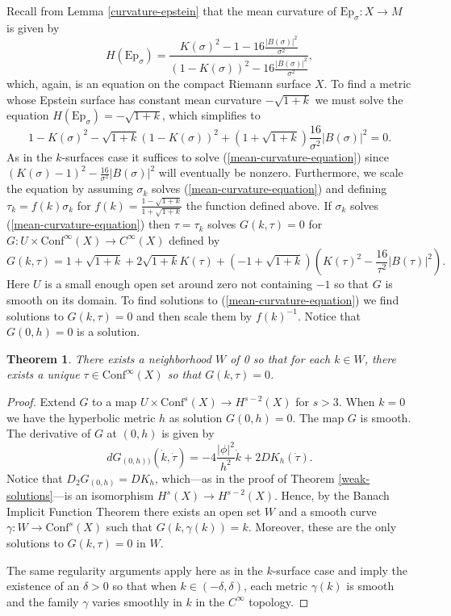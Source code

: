 \documentclass{amsart}
\newtheorem{thm}{Theorem}[section]
\begin{document}
Recall from Lemma \ref{curvature-epstein} that the mean curvature of $\mathrm{Ep}_\sigma: X \to M$ is given by 
\[
H(\mathrm{Ep}_\sigma)
= \frac{K(\sigma)^2 - 1 - 16 \frac{|B(\sigma)|^2}{\sigma^2}}{(1-K(\sigma))^2 - 16 \frac{|B(\sigma)|^2}{\sigma^2}},
\]
which, again, is an equation on the compact Riemann surface $X$.
To find a metric whose Epstein surface has constant mean curvature $-\sqrt{1+k}$ we must solve the equation $H(\mathrm{Ep}_\sigma) = -\sqrt{1+k}$, which simplifies to
\begin{equation}
\label{mean-curvature-equation}
1-K(\sigma)^2 - \sqrt{1+k}(1-K(\sigma))^2 + (1 + \sqrt{1+k})\frac{16}{\sigma^2}|B(\sigma)|^2 = 0.
\end{equation}
As in the $k$-surfaces case it suffices to solve (\ref{mean-curvature-equation}) since $(K(\sigma) - 1)^2 - \frac{16}{\sigma^2}|B(\sigma)|^2$ will eventually be nonzero.
Furthermore, we scale the equation by assuming $\sigma_k$ solves (\ref{mean-curvature-equation}) and defining $\tau_k = f(k) \sigma_k$ for $f(k) = \frac{1-\sqrt{1+k}}{1+\sqrt{1+k}}$ the function defined above. 
If $\sigma_k$ solves (\ref{mean-curvature-equation}) then $\tau = \tau_k$ solves $G(k,\tau) = 0$ for $G: U \times \mathrm{Conf}^\infty(X) \to C^\infty(X)$ defined by 
\[
G(k,\tau) = 1+\sqrt{1+k} + 2\sqrt{1+k}K(\tau) + (-1 + \sqrt{1+k})(K(\tau)^2 - \frac{16}{\tau^2}|B(\tau)|^2).
\]
Here $U$ is a small enough open set around zero not containing $-1$ so that $G$ is smooth on its domain.
To find solutions to (\ref{mean-curvature-equation}) we find solutions to $G(k,\tau) = 0$ and then scale them by $f(k)^{-1}$. 
Notice that $G(0,h) = 0$ is a solution. 

\begin{thm}
There exists a neighborhood $W$ of 0 so that for each $k \in W$, there exists a unique $\tau \in \mathrm{Conf}^\infty(X)$ so that $G(k,\tau) = 0$.
\end{thm}

\begin{proof}
Extend $G$ to a map $U \times \mathrm{Conf}^s(X) \to H^{s-2}(X)$ for $s > 3$. 
When $k = 0$ we have the hyperbolic metric $h$ as solution $G(0,h) = 0$. 
The map $G$ is smooth. 
The derivative of $G$ at $(0,h)$ is given by 
\[
dG_{(0,h))}(\dot{k},\dot{\tau}) = -4 \frac{|\phi|^2}{h^2} \dot{k} + 2 D K_h(\dot{\tau}).
\]
Notice that $D_2 G_{(0,h)} = D K_h$, which---as in the proof of Theorem \ref{weak-solutions}---is an isomorphism $H^s(X) \to H^{s-2}(X)$.
Hence, by the Banach Implicit Function Theorem there exists an open set $W$ and a smooth curve $\gamma: W \to \mathrm{Conf}^{s}(X)$ such that $G(k,\gamma(k)) = k$. 
Moreover, these are the only solutions to $G(k,\tau) = 0$ in $W$.

The same regularity arguments apply here as in the $k$-surface case and imply the existence of an $\delta > 0$ so that when $k \in (-\delta,\delta)$, each metric $\gamma(k)$ is smooth and the family $\gamma$ varies smoothly in $k$ in the $C^\infty$ topology. 
\end{proof}
\end{document}
